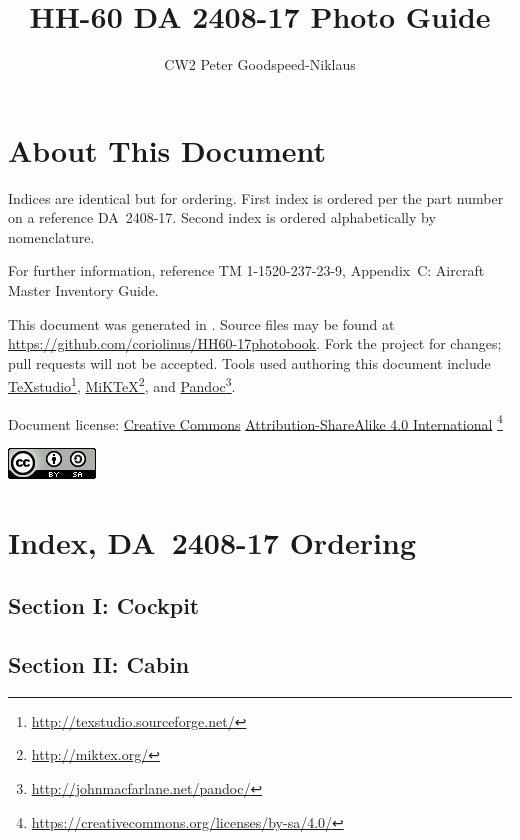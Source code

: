 \documentclass[letterpaper,11pt,openany,oneside]{book}
\author{CW2 Peter Goodspeed-Niklaus}
\title{HH-60 DA 2408-17 Photo Guide}
\begin{document}
\frontmatter
\setcounter{page}{0}
\maketitle
\clearpage
\captionsetup{labelformat=empty}
\chapter*{About This Document}
Indices are identical but for ordering. First index is ordered per the part number on a reference DA~2408-17. Second index is ordered alphabetically by nomenclature.

For further information, reference TM 1-1520-237-23-9, Appendix~C: Aircraft Master Inventory Guide.

This document was generated in \LaTeXe. Source files may be found at \url{https://github.com/coriolinus/HH60-17photobook}. Fork the project for changes; pull requests will not be accepted. Tools used authoring this document include \href{http://texstudio.sourceforge.net/}{TeXstudio}\footnote{\url{http://texstudio.sourceforge.net/}}, \href{http://miktex.org/}{MiKTeX}\footnote{\url{http://miktex.org/}}, and \href{http://johnmacfarlane.net/pandoc/}{Pandoc}\footnote{\url{http://johnmacfarlane.net/pandoc/}}.

Document license: \href{https://creativecommons.org/}{Creative Commons} \href{https://creativecommons.org/licenses/by-sa/4.0/}{Attribution-ShareAlike 4.0 International}
\footnote{\url{https://creativecommons.org/licenses/by-sa/4.0/}}

\begin{center}
	\href{https://creativecommons.org/licenses/by-sa/4.0/}{\includegraphics{Images/cc-by-sa.png}}
\end{center}

\mainmatter
\chapter{Index, DA~2408-17 Ordering}
\section{Section I: Cockpit}

\clearpage
\section{Section II: Cabin}

\clearpage
\end{document}
